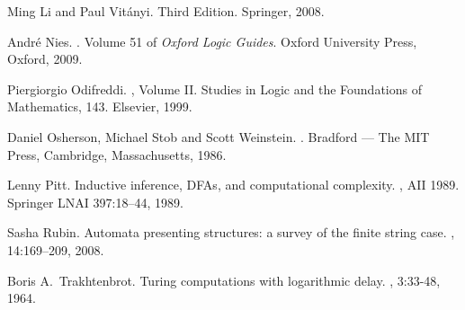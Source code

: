 \documentclass{LMCS}
\theoremstyle{plain}\newtheorem{athm}[thm]{Theorem}
\theoremstyle{plain}\newtheorem{aprop}[thm]{Proposition}
\theoremstyle{plain}\newtheorem{aprob}[thm]{Open Problem}
\theoremstyle{plain}\newtheorem{acor}[thm]{Corollary}
\theoremstyle{plain}\newtheorem{alem}[thm]{Lemma}
\theoremstyle{definition}\newtheorem{adefn}[thm]{Definition}
\theoremstyle{definition}\newtheorem{arem}[thm]{Remark}
\theoremstyle{plain}\newtheorem{aexmp}[thm]{Example}
\theoremstyle{plain}\newtheorem{aclm}[thm]{Claim}
\begin{document}
\begin{thebibliography}{10}
 Ming Li and Paul Vit\'anyi.
\newblock Third Edition. \newblock Springer, 2008.

 Andr\'e Nies.
.
\newblock Volume 51 of {\em Oxford Logic Guides}.
\newblock Oxford University Press, Oxford, 2009.

 Piergiorgio Odifreddi.
, Volume II. 
\newblock Studies in Logic and the Foundations of Mathematics, 143.
\newblock Elsevier, 1999.

 Daniel Osherson, Michael Stob and Scott Weinstein.
.
\newblock Bradford --- The MIT Press, Cambridge, Massachusetts, 1986.

 Lenny Pitt.
\newblock Inductive inference, {DFA}s, and computational complexity.
, AII 1989.
\newblock Springer LNAI 397:18--44, 1989.

 Sasha Rubin.
\newblock Automata presenting structures: a survey of the finite string case.
, 14:169--209, 2008.

 Boris A.\ Trakhtenbrot.
\newblock Turing computations with logarithmic delay.
, 3:33-48, 1964.


\end{thebibliography}
\end{document}
